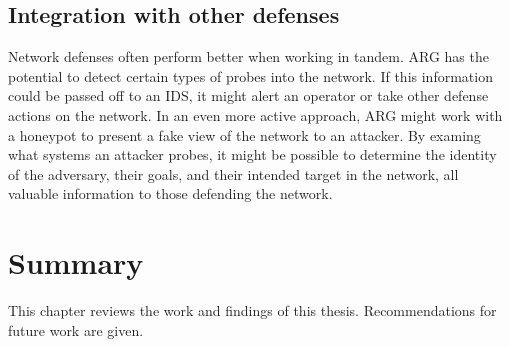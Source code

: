 \subsection{Integration with other defenses}
\par Network defenses often perform better when working in tandem. \ac{ARG} has the potential to detect certain types of probes into the network. If this information could be passed off to an \ac{IDS}, it might alert an operator or take other defense actions on the network. In an even more active approach, \ac{ARG} might work with a honeypot to present a fake view of the network to an attacker. By examing what systems an attacker probes, it might be possible to determine the identity of the adversary, their goals, and their intended target in the network, all valuable information to those defending the network.

\section{Summary}
\par This chapter reviews the work and findings of this thesis. Recommendations for future work are given.

